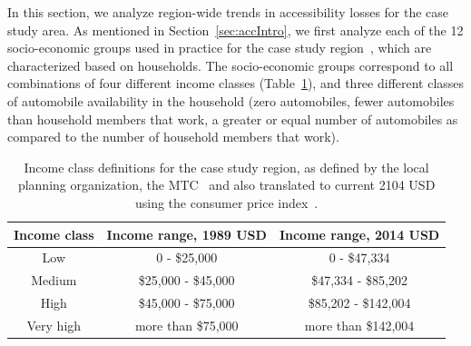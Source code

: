 In this section, we analyze region-wide trends in accessibility losses for the case study area. As mentioned in Section~\ref{sec:accIntro}, we first analyze each of the 12 socio-economic groups used in practice for the case study region~\cite{ory_personal_2013}, which are characterized based on households. The socio-economic groups correspond to all combinations of four different income classes (Table~\ref{tab:incomes}),
and three different classes of automobile availability in the household (zero automobiles, fewer automobiles than household members that work, a greater or equal number of automobiles as compared to the number of household members that work).


\begin{table}
\centering
\begin{tabular}{c|c|c}
\textbf{Income class}           & \textbf{Income range, 1989 USD} & \textbf{Income range, 2014 USD} \\
\hline
Low & 0 - \$25,000 & 0 - \$47,334\\
Medium &  \$25,000 - \$45,000 & \$47,334 - \$85,202\\
High & \$45,000 - \$75,000 & \$85,202 - \$142,004 \\
Very high & more than \$75,000 & more than \$142,004
\end{tabular}
\caption{Income class definitions for the case study region, as defined by the local planning organization, the MTC~\cite{purvis_data_2001,ory_personal_2013} and also translated to current 2104 USD using the consumer price index~\cite{united_states_department_of_labor_guide_2014}.}
\label{tab:incomes}
\end{table}



